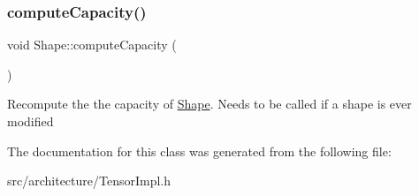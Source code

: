 \subsubsection{\texorpdfstring{compute\+Capacity()}{computeCapacity()}}
{\footnotesize\ttfamily void Shape\+::compute\+Capacity (\begin{DoxyParamCaption}{ }\end{DoxyParamCaption})\hspace{0.3cm}{\ttfamily [inline]}}

Recompute the the capacity of \hyperlink{classShape}{Shape}. Needs to be called if a shape is ever modified 

The documentation for this class was generated from the following file\+:\begin{DoxyCompactItemize}
\item 
src/architecture/Tensor\+Impl.\+h\end{DoxyCompactItemize}
